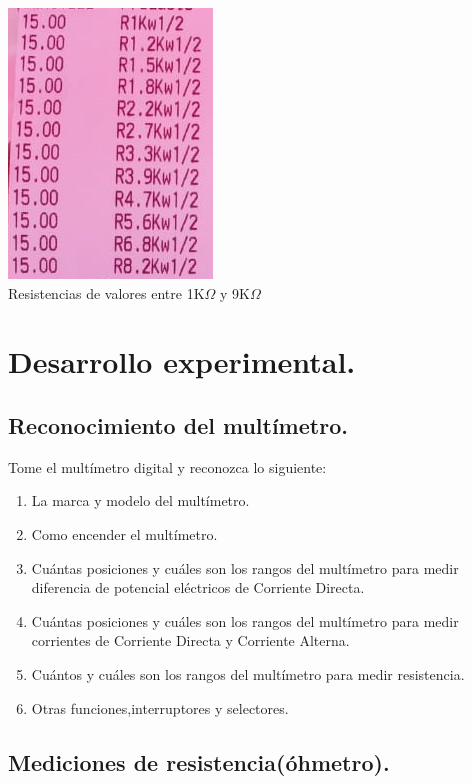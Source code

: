 \documentclass[10pt]{article}
\begin{document}
\begin{multicols}{2}
\begin{center}
	\includegraphics[scale = 1]{Imagenes/Material/Resistencias.jpeg}\\
	Resistencias de valores entre 1K$\Omega$ y 9K$\Omega$

\end{center}


\section{Desarrollo experimental.}

\subsection{Reconocimiento del multímetro.}

Tome el multímetro digital y reconozca lo siguiente:
\begin{enumerate}
	\item La marca y modelo del multímetro.
	\item Como encender el multímetro.
	\item Cuántas posiciones y cuáles son los rangos del multímetro para medir diferencia de potencial eléctricos de Corriente Directa.
	\item Cuántas posiciones y cuáles son los rangos del multímetro para medir corrientes de Corriente Directa y Corriente Alterna.
	\item Cuántos y cuáles son los rangos del multímetro para medir resistencia.
	\item Otras funciones,interruptores y selectores.
\end{enumerate}

\subsection{Mediciones de resistencia(óhmetro).}


\end{multicols}
\end{document}
